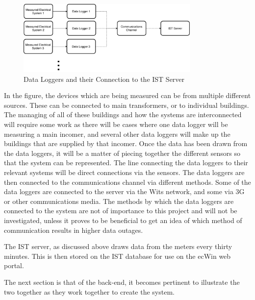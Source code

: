 \documentclass[12pt,onecolumn]{IEEEtran}
\begin{document}
\begin{center}
    \begin{figure}[htb]
        \centering
        \includegraphics[width=0.8\textwidth]{Data Logger.pdf}
        \caption{Data Loggers and their Connection to the IST Server}
        \label{fig:dataloggers}
    \end{figure}
\end{center}
In the figure, the devices which are being measured can be from multiple different sources. These can be connected to main transformers, or to individual buildings. The managing of all of these buildings and how the systems are interconnected will require some work as there will be cases where one data logger will be measuring a main incomer, and several other data loggers will make up the buildings that are supplied by that incomer. 
Once the data has been drawn from the data loggers, it will be a matter of piecing together the different sensors so that the system can be represented. 
The line connecting the data loggers to their relevant systems will be direct connections via the sensors. The data loggers are then connected to the communications channel via different methods. Some of the data loggers are connected to the server via the Wits network, and some via 3G or other communications media. The methods by which the data loggers are connected to the system are not of importance to this project and will not be investigated, unless it proves to be beneficial to get an idea of which method of communication results in higher data outages.

The IST server, as discussed above draws data from the meters every thirty minutes. This is then stored on the IST database for use on the ecWin web portal.

The next section is that of the back-end, it becomes pertinent to illustrate the two together as they work together to create the system. 
\end{document}
